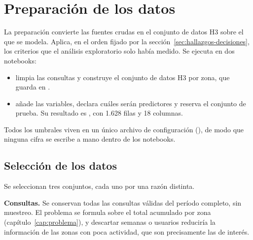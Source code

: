 \section{Preparación de los datos}
\label{sec:preparacion-datos}

La preparación convierte las fuentes crudas en el conjunto de datos H3 sobre el que se modela.
Aplica, en el orden fijado por la sección~\ref{sec:hallazgos-decisiones}, los criterios que
el análisis exploratorio solo había medido. Se ejecuta en dos notebooks:
\begin{itemize}
  \item {} limpia las consultas y construye el conjunto de datos H3 por zona, que
        guarda en .
  \item {} añade las variables, declara cuáles serán predictores y
        reserva el conjunto de prueba. Su resultado es
        , con 1.628 filas y 18 columnas.
\end{itemize}
Todos los umbrales viven en un único archivo de configuración (), de modo
que ninguna cifra se escribe a mano dentro de los notebooks.

\subsection{Selección de los datos}
\label{sec:seleccion-datos}

Se seleccionan tres conjuntos, cada uno por una razón distinta.

\textbf{Consultas.} Se conservan todas las consultas válidas del período completo, sin
muestreo. El problema se formula sobre el total acumulado por zona
(capítulo~\ref{cap:problema}), y descartar semanas o usuarios reduciría la información de
las zonas con poca actividad, que son precisamente las de interés.

